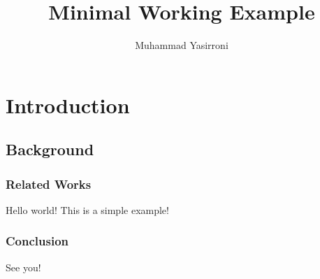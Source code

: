 \documentclass[master,bahasa,table,xcdraw]{thesisdtetiugm}
\title{Minimal Working Example}
\author{Muhammad Yasirroni}{<<NIM>>}  %
\begin{document}

\chapter{Introduction}
\section{Background}
\subsection{Related Works}
Hello world! This is a simple example!

\subsection{Conclusion}
See you!
\end{document}
